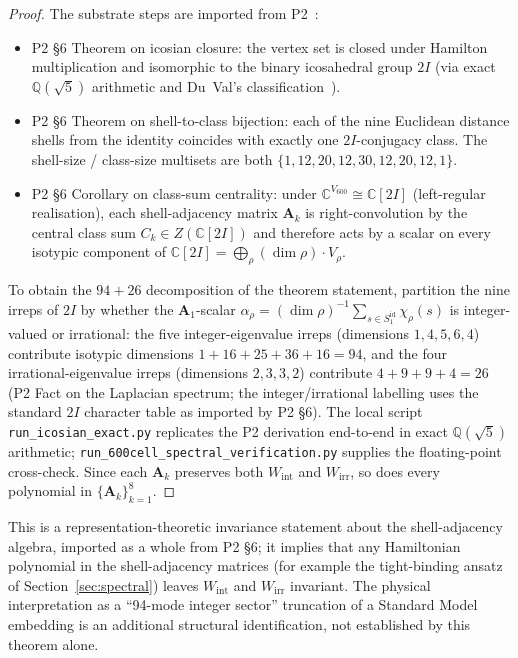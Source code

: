 \documentclass[12pt]{article}
\begin{document}
\begin{proof}
The substrate steps are imported from P2~\citep{CascadeAlgSubstrate}:
\begin{itemize}
    \item P2 \S 6 Theorem on icosian closure: the vertex set is closed under Hamilton multiplication and isomorphic to the binary icosahedral group $2I$ (via exact $\mathbb{Q}(\sqrt 5)$ arithmetic and Du~Val's classification~\citep[Ch.~3]{DuVal1964}).
    \item P2 \S 6 Theorem on shell-to-class bijection: each of the nine Euclidean distance shells from the identity coincides with exactly one $2I$-conjugacy class. The shell-size / class-size multisets are both $\{1, 12, 20, 12, 30, 12, 20, 12, 1\}$.
    \item P2 \S 6 Corollary on class-sum centrality: under $\mathbb{C}^{V_{600}} \cong \mathbb{C}[2I]$ (left-regular realisation), each shell-adjacency matrix $\mathbf{A}_k$ is right-convolution by the central class sum $C_k \in Z(\mathbb{C}[2I])$ and therefore acts by a scalar on every isotypic component of $\mathbb{C}[2I] = \bigoplus_\rho (\dim\rho)\cdot V_\rho$.
\end{itemize}
To obtain the $94{+}26$ decomposition of the theorem statement, partition the nine irreps of $2I$ by whether the $\mathbf{A}_1$-scalar $\alpha_\rho = (\dim\rho)^{-1} \sum_{s \in S_1^{\mathrm{id}}} \chi_\rho(s)$ is integer-valued or irrational: the five integer-eigenvalue irreps (dimensions $1, 4, 5, 6, 4$) contribute isotypic dimensions $1 + 16 + 25 + 36 + 16 = 94$, and the four irrational-eigenvalue irreps (dimensions $2, 3, 3, 2$) contribute $4 + 9 + 9 + 4 = 26$ (P2 Fact on the Laplacian spectrum; the integer/irrational labelling uses the standard $2I$ character table as imported by P2 \S 6). The local script \texttt{run\_icosian\_exact.py} replicates the P2 derivation end-to-end in exact $\mathbb{Q}(\sqrt 5)$ arithmetic; \texttt{run\_600cell\_spectral\_verification.py} supplies the floating-point cross-check. Since each $\mathbf{A}_k$ preserves both $W_{\mathrm{int}}$ and $W_{\mathrm{irr}}$, so does every polynomial in $\{\mathbf{A}_k\}_{k=1}^8$.
\end{proof}

This is a representation-theoretic invariance statement about the shell-adjacency algebra, imported as a whole from P2 \S 6; it implies that any Hamiltonian polynomial in the shell-adjacency matrices (for example the tight-binding ansatz of Section~\ref{sec:spectral}) leaves $W_{\mathrm{int}}$ and $W_{\mathrm{irr}}$ invariant. The physical interpretation as a ``94-mode integer sector'' truncation of a Standard Model embedding is an additional structural identification, not established by this theorem alone.
\end{document}
